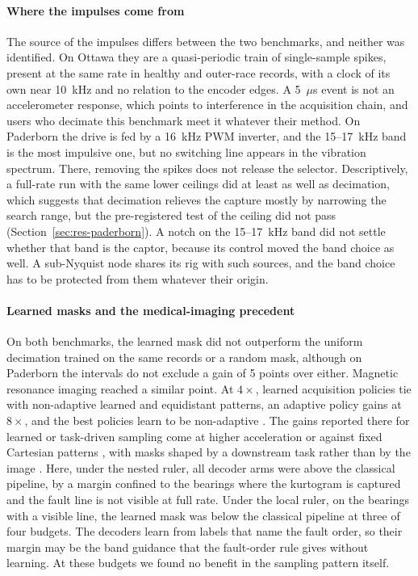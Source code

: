 \paragraph{Where the impulses come from}
The source of the impulses differs between the two benchmarks, and neither was identified. On
Ottawa they are a quasi-periodic train of single-sample spikes, present at the same rate in healthy
and outer-race records, with a clock of its own near 10~kHz and no relation to the encoder edges. A
5~$\mu$s event is not an accelerometer response, which points to interference in the acquisition
chain, and users who decimate this benchmark meet it whatever their method. On Paderborn the drive
is fed by a 16~kHz PWM inverter, and the 15--17~kHz band is the most impulsive one, but no switching
line appears in the vibration spectrum. There, removing the spikes does not release the selector.
Descriptively, a full-rate run with the same lower ceilings did at least as well as decimation,
which suggests that decimation relieves the capture mostly by narrowing the search range, but the
pre-registered test of the ceiling did not pass (Section~\ref{sec:res-paderborn}). A notch on the
15--17~kHz band did not settle whether that band is the captor, because its control moved the band
choice as well. A sub-Nyquist node shares its rig with such sources, and the band choice has to be
protected from them whatever their origin.

\paragraph{Learned masks and the medical-imaging precedent}
On both benchmarks, the learned mask did not outperform the uniform decimation trained on the same
records or a random mask, although on Paderborn the intervals do not exclude a gain of 5 points
over either. Magnetic resonance imaging reached a similar point. At $4\times$, learned acquisition
policies tie with non-adaptive learned and equidistant patterns, an adaptive policy gains at
$8\times$, and the best policies learn to be non-adaptive \citep{bakker2022adaptive}. The gains
reported there for learned or task-driven sampling come at higher acceleration or against fixed
Cartesian patterns \citep{bakker2022adaptive,xu2026hierasample}, with masks shaped by a downstream
task rather than by the image \citep{weber2024prom}. Here, under the nested ruler, all decoder arms
were above the classical pipeline, by a margin confined to the bearings where the kurtogram is
captured and the fault line is not visible at full rate. Under the local ruler, on the bearings with
a visible line, the learned mask was below the classical pipeline at three of four budgets. The
decoders learn from labels that name the fault order, so their margin may be the band guidance that
the fault-order rule gives without learning. At these budgets we found no benefit in the sampling
pattern itself.

